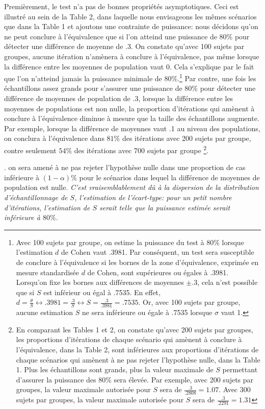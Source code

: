 \documentclass[
  english,
  man]{apa6}
\begin{document}
Premièrement, le test n'a pas de bonnes propriétés asymptotiques. Ceci est illustré au sein de la Table 2, dans laquelle nous envisageons les mêmes scénarios que dans la Table 1 et ajoutons une contrainte de puissance: nous décidons qu'on ne peut conclure à l'équivalence que si l'on atteind une puissance de 80\% pour détecter une différence de moyenne de .3. On constate qu'avec 100 sujets par groupes, aucune itération n'amènera à conclure à l'équivalence, pas même lorsque la différence entre les moyennes de population vaut 0. Cela s'explique par le fait que l'on n'atteind jamais la puissance minimale de \(80\%\).\footnote{Avec 100 sujets par groupe, on estime la puissance du test à $80\%$ lorsque l'estimation $d$ de Cohen vaut .3981. Par conséquent, un test sera susceptible de conclure à l'équivalence si les bornes de la zone d'équivalence, exprimée en mesure standardisée $d$ de Cohen, sont supérieures ou égales à .3981. Lorsqu'on fixe les bornes aux différences de moyennes $\pm .3$, cela n'est possible que si $S$ est inférieur ou égal à .7535. En effet, $d=\frac{\theta}{S} \leftrightarrow .3981 = \frac{.3}{S} \leftrightarrow S = \frac{.3}{.3981}=.7535$.  Or, avec 100 sujets par groupe, aucune estimation $S$ ne sera inférieure ou égale à .7535 lorsque $\sigma$ vaut 1.} Par contre, une fois les échantillons assez grands pour s'assurer une puissance de \(80\%\) pour détecter une différence de moyennes de population de .3, lorsque la différence entre les moyennes de populations est non nulle, la proportion d'itérations qui amènent à conclure à l'équivalence diminue à mesure que la taille des échantillons augmente. Par exemple, lorsque la différence de moyennes vaut .1 au niveau des populations, on conclura à l'équivalence dans \(81\%\) des itérations avec 200 sujets par groupe, contre seulement \(54\%\) des itérations avec 700 sujets par groupe \footnote{En comparant les Tables 1 et 2, on constate qu'avec 200 sujets par groupes, les proportions d'itérations de chaque scénario qui amènent à conclure à l'équivalence, dans la Table 2, sont inférieures aux proportions d'itérations de chaque scénarios qui amènent à ne pas rejeter l'hypothèse nulle, dans la Table 1. Plus les échantillons sont grands, plus la valeur maximale de $S$ permettant d'assurer la puissance des $80\%$ sera élevée. Par exemple, avec 200 sujets par groupes, la valeur maximale autorisée pour $S$ sera de $\frac{.3}{.2808}=1.07$. Avec 300 sujets par groupes, la valeur maximale autorisée pour $S$ sera de $\frac{.3}{.2291}=1.31$}.

. on sera amené à ne pas rejeter l'hypothèse nulle dans une proportion de cas inférieure à \((1-\alpha)\%\) pour le scénarios dans lequel la différence de moyennes de population est nulle. \emph{C'est vraisemblablement dû à la dispersion de la distribution d'échantillonnage de \(S\), l'estimation de l'écart-type: pour un petit nombre d'itérations, l'estimation de \(S\) serait telle que la puissance estimée serait inférieure à \(80\%\).}
\end{document}
